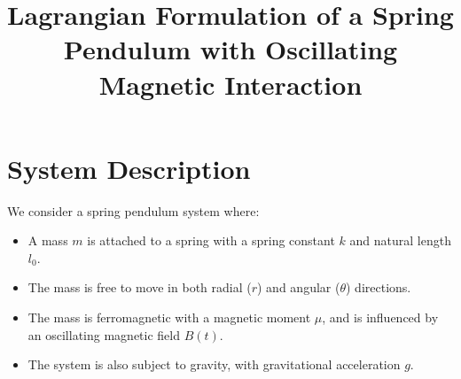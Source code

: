 \documentclass[12pt]{article}
\title{Lagrangian Formulation of a Spring Pendulum with Oscillating Magnetic Interaction}
\author{}
\date{}
\begin{document}
\maketitle
\tableofcontents
\newpage
\section{System Description}
We consider a spring pendulum system where:
\begin{itemize}
    \item A mass \( m \) is attached to a spring with a spring constant \( k \) and natural length \( l_0 \).
    \item The mass is free to move in both radial (\( r \)) and angular (\( \theta \)) directions.
    \item The mass is ferromagnetic with a magnetic moment \( \mu \), and is influenced by an oscillating magnetic field \( B(t) \).
    \item The system is also subject to gravity, with gravitational acceleration \( g \).
\end{itemize}
\end{document}
